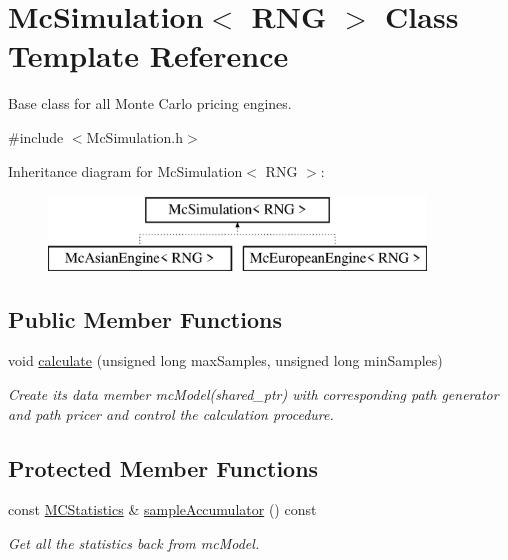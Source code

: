 \hypertarget{class_mc_simulation}{}\section{Mc\+Simulation$<$ R\+NG $>$ Class Template Reference}
\label{class_mc_simulation}


Base class for all Monte Carlo pricing engines.  




{\ttfamily \#include $<$Mc\+Simulation.\+h$>$}

Inheritance diagram for Mc\+Simulation$<$ R\+NG $>$\+:\begin{figure}[H]
\begin{center}
\leavevmode
\includegraphics[height=2.000000cm]{class_mc_simulation}
\end{center}
\end{figure}
\subsection*{Public Member Functions}
\begin{DoxyCompactItemize}
\item 
void \hyperlink{class_mc_simulation_acaa09060a9ee90e0cc3631d8b30ebae0}{calculate} (unsigned long max\+Samples, unsigned long min\+Samples)
\begin{DoxyCompactList}\small\item\em Create its data member mc\+Model(shared\+\_\+ptr) with corresponding path generator and path pricer and control the calculation procedure. \end{DoxyCompactList}\end{DoxyCompactItemize}
\subsection*{Protected Member Functions}
\begin{DoxyCompactItemize}
\item 
const \hyperlink{class_m_c_statistics}{M\+C\+Statistics} \& \hyperlink{class_mc_simulation_ae806933e305840081ef1554ad17012c3}{sample\+Accumulator} () const
\begin{DoxyCompactList}\small\item\em Get all the statistics back from mc\+Model. \end{DoxyCompactList}\end{DoxyCompactItemize}
